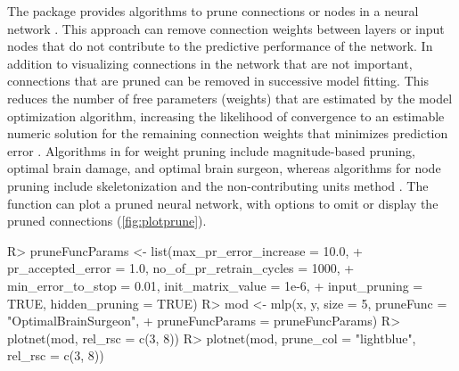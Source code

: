 \documentclass[article]{jss}
\begin{document}
The  package provides algorithms to prune connections or
nodes in a neural network \citep{Bergmeir12}.  This approach can
remove connection weights between layers or input nodes that do not
contribute to the predictive performance of the network.  In addition
to visualizing connections in the network that are not important,
connections that are pruned can be removed in successive model
fitting.  This reduces the number of free parameters (weights) that
are estimated by the model optimization algorithm, increasing the
likelihood of convergence to an estimable numeric solution for the
remaining connection weights that minimizes prediction error
\citep[i.e., model identifiability;][]{Ellenius00}. Algorithms in
 for weight pruning include magnitude-based pruning,
optimal brain damage, and optimal brain surgeon, whereas algorithms
for node pruning include skeletonization and the non-contributing
units method \citep{Zell98}.  The  function can plot a
pruned neural network, with options to omit or display the pruned
connections (\cref{fig:plotprune}).
%
\begin{Schunk}
\begin{Sinput}
R> pruneFuncParams <- list(max_pr_error_increase = 10.0,
+    pr_accepted_error = 1.0, no_of_pr_retrain_cycles = 1000, 
+    min_error_to_stop = 0.01, init_matrix_value = 1e-6,  
+    input_pruning = TRUE, hidden_pruning = TRUE)
R> mod <- mlp(x, y, size = 5, pruneFunc = "OptimalBrainSurgeon",
+    pruneFuncParams = pruneFuncParams)
R> plotnet(mod, rel_rsc = c(3, 8))
R> plotnet(mod, prune_col = "lightblue", rel_rsc = c(3, 8))
\end{Sinput}
\end{Schunk}
%
\end{document}
